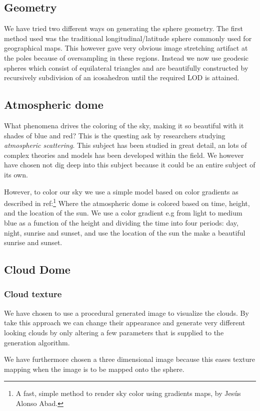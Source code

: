 \subsection{Geometry}
We have tried two different ways on generating the sphere
geometry. The first method used was the traditional longitudinal/latitude
sphere commonly used for geographical maps. This
however gave very obvious image stretching artifact at the poles
because of oversampling in these regions. Instead we now use geodesic
spheres which consist of equilateral triangles and are beautifully
constructed by recursively subdivision of an icosahedron until the
required LOD is attained.

\subsection{Atmospheric dome}
What phenomena drives the coloring of the sky, making it so beautiful
with it shades of blue and red?
This is the questing ask by researchers studying 
\emph{atmospheric scattering}. This subject has been studied in great detail,
an lots of complex theories and models has been developed within the
field.
We however have chosen not dig deep into this subject because it could
be an entire subject of its own.

However, to color our sky we use a simple model based on color
gradients as described in ref:\footnote{A fast, simple method to
  render sky color using gradients maps, by Jesús Alonso Abad.}
Where the atmospheric dome is colored based on time, height, and the
location of the sun.
We use a color gradient e.g from light to medium blue as a function of
the height and dividing the time into four periods: day, night,
sunrise and sunset, and use the location of the sun the make a
beautiful sunrise and sunset.

\subsection{Cloud Dome}

\subsubsection{Cloud texture}
We have chosen to use a procedural generated image to visualize the
clouds. By take this approach we can change their appearance and
generate very different looking clouds by only altering a few
parameters that is supplied to the generation algorithm.

We have furthermore chosen a three dimensional image because this
eases texture mapping when the image is to be mapped onto the sphere.


